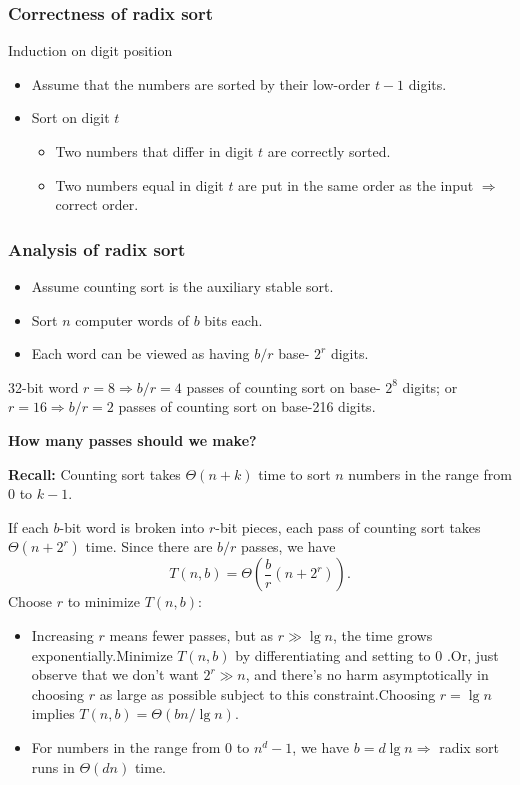 \documentclass[11pt,toc=twocol]{elegantbook}
\begin{document}
\subsubsection{Correctness of radix sort}
Induction on digit position 
\begin{itemize}
    \item Assume that the numbers are sorted by their low-order $t-1$ digits.
    \item Sort on digit $t$
    \begin{itemize}
        \item Two numbers that differ in digit $t$ are correctly sorted.
        \item Two numbers equal in digit $t$ are put in the same order as the input $\Rightarrow$ correct order.
    \end{itemize}
    
\end{itemize}

\subsubsection{Analysis of radix sort}

\begin{itemize}
    \item Assume counting sort is the auxiliary stable sort.
    \item Sort $n$ computer words of $b$ bits each.
    \item Each word can be viewed as having $b / r$ base- $2^{r}$ digits.
\end{itemize}

\begin{example}
    32-bit word
    $r=8 \Rightarrow b / r=4$ passes of counting sort on
base- $2^{8}$ digits; or $r=16 \Rightarrow b / r=2$ passes of counting sort on base-216 digits.

\begin{center}
    \textbf{How many passes should we make?}
\end{center}
\end{example}
\begin{note}
    \textbf{Recall:} Counting sort takes $\Theta(n+k)$ time to sort $n$ numbers in the range from 0 to $k-1$.
\end{note}
If each $b$-bit word is broken into $r$-bit pieces, each pass of counting sort takes $\Theta\left(n+2^{r}\right)$ time. Since there are $b / r$ passes, we have
    $$
T(n, b)=\Theta\left(\frac{b}{r}\left(n+2^{r}\right)\right) .
$$
Choose $r$ to minimize $T(n, b):$
\begin{itemize}
    \item Increasing $r$ means fewer passes, but as $r \gg \lg n$, the time grows exponentially.Minimize $T(n, b)$ by differentiating and setting to 0 .Or, just observe that we don't want $2^{r} \gg n$, and there's no harm asymptotically in choosing $r$ as large as possible subject to this constraint.Choosing $r=\lg n$ implies $T(n, b)=\Theta(b n / \lg n)$.
    \item For numbers in the range from 0 to $n^{d}-1$, we have $b=d \lg n \Rightarrow$ radix sort runs in $\Theta(d n)$ time.
\end{itemize}
\end{document}
